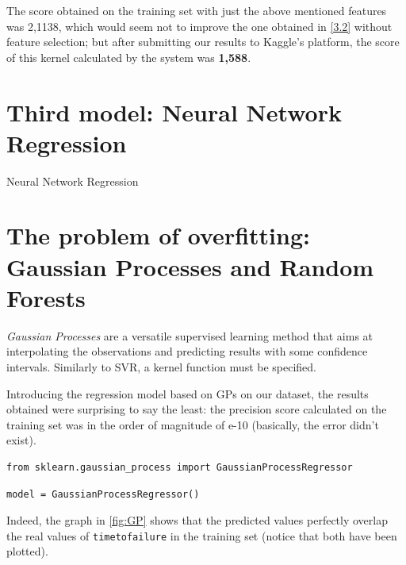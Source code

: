 

The score obtained on the training set with just the above mentioned features was 2,1138, which would seem not to improve the one obtained in \ref{3.2} without feature selection; but after submitting our results to Kaggle's platform, the score of this kernel calculated by the system was \textbf{1,588}.

\section[Third model]{Third model: Neural Network Regression}
Neural Network Regression

\section[Overfitting]{The problem of overfitting: Gaussian Processes and Random Forests}
\textit{Gaussian Processes} are a versatile supervised learning method that aims at interpolating the observations and predicting results with some confidence intervals. Similarly to SVR, a kernel function must be specified.

Introducing the regression model based on GPs on our dataset, the results obtained were surprising to say the least: the precision score calculated on the training set was in the order of magnitude of e-10 (basically, the error didn't exist).

\begin{lstlisting}[firstnumber=14]
from sklearn.gaussian_process import GaussianProcessRegressor
\end{lstlisting}

\begin{lstlisting}[firstnumber=101]
model = GaussianProcessRegressor()
\end{lstlisting}

Indeed, the graph in \ref{fig:GP} shows that the predicted values perfectly overlap the real values of \texttt{time\textunderscore to\textunderscore failure} in the training set (notice that both have been plotted).

